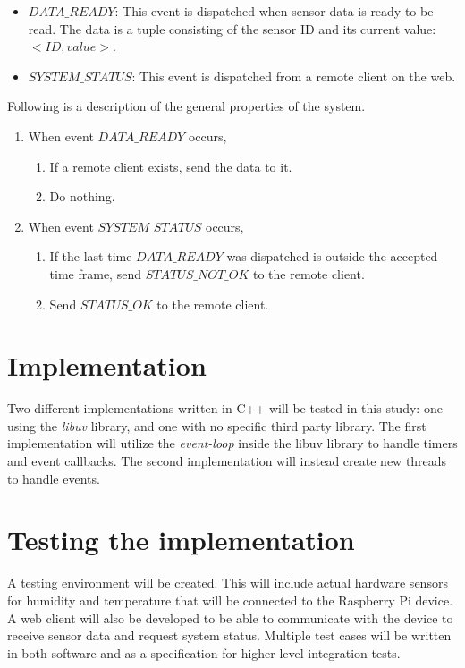 \begin{itemize}
\item
  $DATA\_READY$: This event is dispatched when sensor data is ready to be read.
The data is a tuple consisting of the sensor ID and its current value: $<ID,
value>$.
\item
  $SYSTEM\_STATUS$: This event is dispatched from a remote client on the web.
\end{itemize}

Following is a description of the general properties of the system.

\begin{enumerate}
\item
  When event $DATA\_READY$ occurs,
\begin{enumerate}
\item
  If a remote client exists, send the data to it.
\item
  Do nothing.
\end{enumerate}
\item
  When event $SYSTEM\_STATUS$ occurs,
\begin{enumerate}
\item
  If the last time $DATA\_READY$ was dispatched is outside the accepted time
frame, send $STATUS\_NOT\_OK$ to the remote client.
\item
  Send $STATUS\_OK$ to the remote client.
\end{enumerate}
\end{enumerate}

\section{Implementation}

Two different implementations written in C++ will be tested in this study: one
using the \textit{libuv} library, and one with no specific third party library.
The first implementation will utilize the \textit{event-loop} inside the libuv
library to handle timers and event callbacks. The second implementation will
instead create new threads to handle events.

\section{Testing the implementation}

A testing environment will be created. This will include actual hardware
sensors for humidity and temperature that will be connected to the Raspberry Pi
device. A web client will also be developed to be able to communicate with the
device to receive sensor data and request system status. Multiple test cases
will be written in both software and as a specification for higher level
integration tests.

